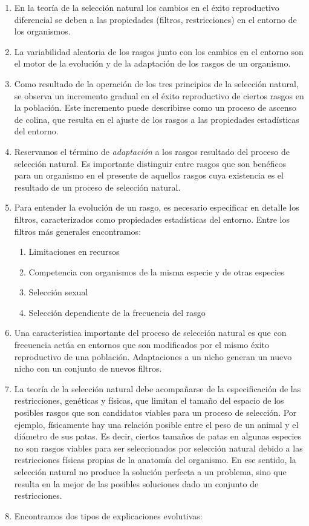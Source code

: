 \documentclass[
  a4paper,
  DIV=11,
  numbers=noendperiod]{scrreprt}
\providecommand{\tightlist}{%
  \setlength{\itemsep}{0pt}\setlength{\parskip}{0pt}}\usepackage{longtable,booktabs,array}
\begin{document}
\begin{enumerate}
\def\labelenumi{\arabic{enumi}.}
\item
  En la teoría de la selección natural los cambios en el éxito
  reproductivo diferencial se deben a las propiedades (filtros,
  restricciones) en el entorno de los organismos.
\item
  La variabilidad aleatoria de los rasgos junto con los cambios en el
  entorno son el motor de la evolución y de la adaptación de los rasgos
  de un organismo.
\item
  Como resultado de la operación de los tres principios de la selección
  natural, se observa un incremento gradual en el éxito reproductivo de
  ciertos rasgos en la población. Este incremento puede describirse como
  un proceso de ascenso de colina, que resulta en el ajuste de los
  rasgos a las propiedades estadísticas del entorno.
\item
  Reservamos el término de \emph{adaptación} a los rasgos resultado del
  proceso de selección natural. Es importante distinguir entre rasgos
  que son benéficos para un organismo en el presente de aquellos rasgos
  cuya existencia es el resultado de un proceso de selección natural.
\item
  Para entender la evolución de un rasgo, es necesario especificar en
  detalle los filtros, caracterizados como propiedades estadísticas del
  entorno. Entre los filtros más generales encontramos:

  \begin{enumerate}
  \def\labelenumii{\alph{enumii}.}
  \tightlist
  \item
    Limitaciones en recursos
  \item
    Competencia con organismos de la misma especie y de otras especies
  \item
    Selección sexual
  \item
    Selección dependiente de la frecuencia del rasgo
  \end{enumerate}
\item
  Una característica importante del proceso de selección natural es que
  con frecuencia actúa en entornos que son modificados por el mismo
  éxito reproductivo de una población. Adaptaciones a un nicho generan
  un nuevo nicho con un conjunto de nuevos filtros.
\item
  La teoría de la selección natural debe acompañarse de la
  especificación de las restricciones, genéticas y físicas, que limitan
  el tamaño del espacio de los posibles rasgos que son candidatos
  viables para un proceso de selección. Por ejemplo, físicamente hay una
  relación posible entre el peso de un animal y el diámetro de sus
  patas. Es decir, ciertos tamaños de patas en algunas especies no son
  rasgos viables para ser seleccionados por selección natural debido a
  las restricciones físicas propias de la anatomía del organismo. En ese
  sentido, la selección natural no produce la solución perfecta a un
  problema, sino que resulta en la mejor de las posibles soluciones dado
  un conjunto de restricciones.
\item
  Encontramos dos tipos de explicaciones evolutivas:


\end{enumerate}
\end{document}
